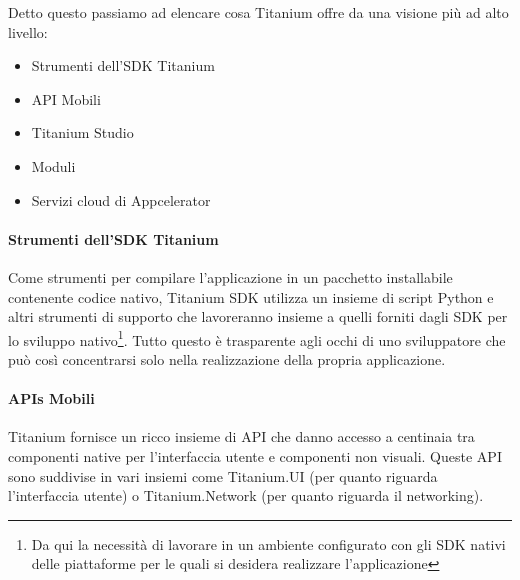             \clearpage
            \noindent Detto questo passiamo ad elencare cosa Titanium offre da
            una visione più ad alto livello\citep[Cap.2 - Titanium
            Mobile Overview]{Book:Ti}:
            \begin{itemize}
                \item Strumenti dell'SDK Titanium
                \item API Mobili
                \item Titanium Studio
                \item Moduli
                \item Servizi cloud di Appcelerator
            \end{itemize}

            \paragraph{Strumenti dell'SDK Titanium}
                Come strumenti per compilare l'applicazione in un pacchetto
                installabile contenente codice nativo, Titanium SDK utilizza un
                insieme di script Python e altri strumenti di supporto che
                lavoreranno insieme a quelli forniti dagli SDK per lo sviluppo
                nativo\footnote{Da qui la necessità di lavorare in un ambiente
                configurato con gli SDK nativi delle piattaforme per le quali si
                desidera realizzare l'applicazione}. Tutto questo è trasparente
                agli occhi di uno sviluppatore che può così concentrarsi solo
                nella realizzazione della propria applicazione.

            \paragraph{APIs Mobili}
                Titanium fornisce un ricco insieme di API \js{} che danno
                accesso a centinaia tra componenti native per l'interfaccia
                utente e componenti non visuali. Queste API sono suddivise in
                vari insiemi come Titanium.UI (per quanto riguarda l'interfaccia
                utente) o Titanium.Network (per quanto riguarda il networking).


